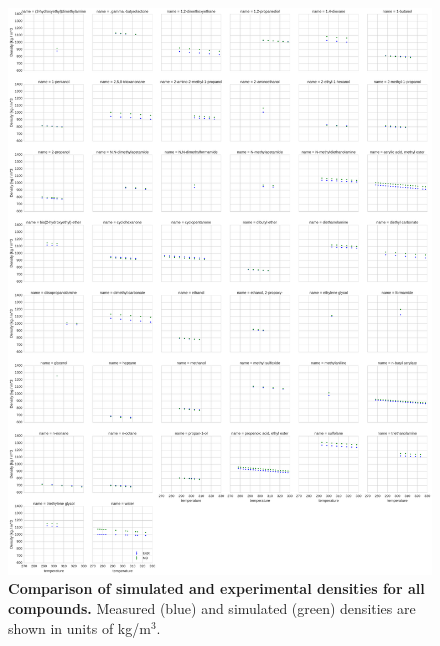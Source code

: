 \documentclass[aps,pre,twocolumn,nofootinbib,superscriptaddress,linenumbers]{revtex4-1}
\begin{document}
\begin{figure}

\includegraphics[width=\textwidth]{./figures/densities_versus_temperature_all.pdf}

\caption{{\bf Comparison of simulated and experimental densities for all compounds.} 
Measured (blue) and simulated (green) densities are shown in units of kg/m$^3$.
\label{figure:AllDensities}
}

\end{figure}

\end{document}
